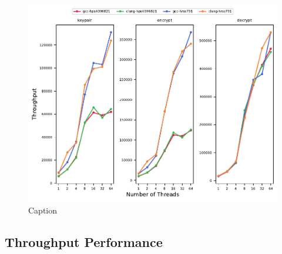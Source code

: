 \begin{figure}
    \centering
    \includegraphics{chapters/results/throughput/Modern Workstation_ntru.pdf}
    \caption{Caption}
    \label{figure:results:throughput:ntru-modern-workstation}
\end{figure}



\subsection{Throughput Performance}

